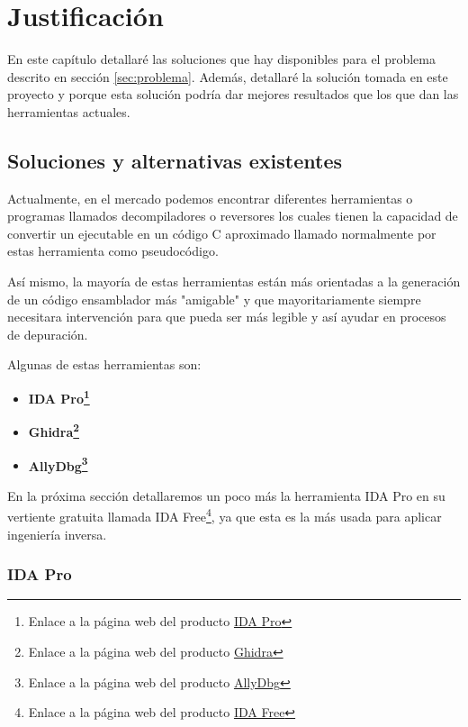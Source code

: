 \chapter{Justificación}
\label{cap:justificacion}


En este capítulo detallaré las soluciones que hay disponibles para el problema descrito en sección \ref{sec:problema}. Además, detallaré la solución tomada en este proyecto
y porque esta solución podría dar mejores resultados que los que dan las herramientas actuales.

\section{Soluciones y alternativas existentes}
\label{sec:alternativas}


Actualmente, en el mercado podemos encontrar diferentes herramientas o programas llamados decompiladores o reversores los cuales tienen la capacidad de convertir un ejecutable
en un código C aproximado llamado normalmente por estas herramienta como pseudocódigo.

Así mismo, la mayoría de estas herramientas están más orientadas a la generación de un código ensamblador más "amigable" y que mayoritariamente siempre necesitara intervención
para que pueda ser más legible y así ayudar en procesos de depuración.

Algunas de estas herramientas son:

\begin{itemize}
    \item \bf IDA Pro\footnote{Enlace a la página web del producto \href{https://hex-rays.com/ida-pro/}{IDA Pro}}
    \item \bf Ghidra\footnote{Enlace a la página web del producto \href{https://ghidra-sre.org/}{Ghidra}}
    \item \bf AllyDbg\footnote{Enlace a la página web del producto \href{https://www.ollydbg.de/}{AllyDbg}}
\end{itemize}

En la próxima sección detallaremos un poco más la herramienta IDA Pro en su vertiente gratuita llamada IDA Free\footnote{Enlace a la página web del producto \href{https://hex-rays.com/ida-free/}{IDA Free}},
ya que esta es la más usada para aplicar ingeniería inversa.

\subsection{IDA Pro}
\label{subsec:IDA_pro}

